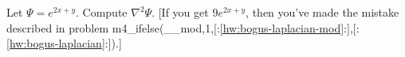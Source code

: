 Let $\Psi=e^{2x+y}$. Compute $\nabla^2\Psi$.
[If you get $9e^{2x+y}$, then you've made the mistake described in
problem m4_ifelse(__mod,1,[:\ref{hw:bogus-laplacian-mod}:],[:\ref{hw:bogus-laplacian}:]).]\answercheck
